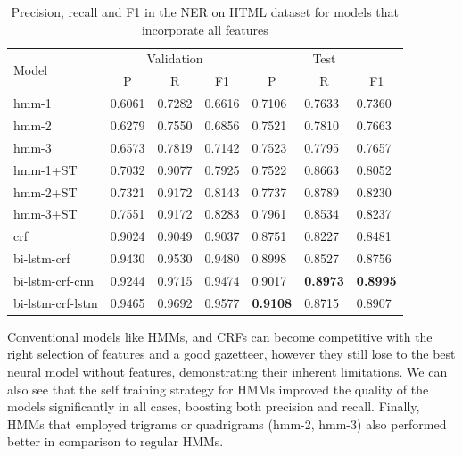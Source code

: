 \documentclass{nle}
\begin{document}
\begin{table}[h]
  \small
  \begin{center}
    \begin{tabular}{ lllllll }
      \toprule
      \multirow{2}{*}{Model} & \multicolumn{3}{c}{Validation} & \multicolumn{3}{c}{Test} \\
                             & \multicolumn{1}{c}{P} & \multicolumn{1}{c}{R} & \multicolumn{1}{c}{F1}
                             & \multicolumn{1}{c}{P} & \multicolumn{1}{c}{R} & \multicolumn{1}{c}{F1} \\
      \midrule
      hmm-1	         & 0.6061 & 0.7282 & 0.6616 & 0.7106 & 0.7633 & 0.7360 \\
      hmm-2	         & 0.6279 & 0.7550 & 0.6856 & 0.7521 & 0.7810 & 0.7663 \\
      hmm-3	         & 0.6573 & 0.7819 & 0.7142 & 0.7523 & 0.7795 & 0.7657 \\
      hmm-1+ST           & 0.7032 & 0.9077 & 0.7925 & 0.7522 & 0.8663 & 0.8052 \\
      hmm-2+ST           & 0.7321 & 0.9172 & 0.8143 & 0.7737 & 0.8789 & 0.8230 \\
      hmm-3+ST           & 0.7551 & 0.9172 & 0.8283 & 0.7961 & 0.8534 & 0.8237 \\
      crf	         & 0.9024 & 0.9049 & 0.9037 & 0.8751 & 0.8227 & 0.8481 \\
      bi-lstm-crf        & 0.9430 & 0.9530 & 0.9480 & 0.8998 & 0.8527 & 0.8756 \\
      bi-lstm-crf-cnn    & 0.9244 & 0.9715 & 0.9474 & 0.9017 & \textbf{0.8973} & \textbf{0.8995} \\
      bi-lstm-crf-lstm   & 0.9465 & 0.9692 & 0.9577 & \textbf{0.9108} & 0.8715 & 0.8907 \\
      \bottomrule
    \end{tabular}
  \end{center}
  \caption{Precision, recall and F1 in the NER on HTML dataset for models that incorporate all features}
  \label{tab:experiment2}
\end{table}

Conventional models like HMMs, and CRFs can become competitive with
the right selection of features and a good gazetteer, however they still lose
to the best neural model without features, demonstrating their inherent limitations.
We can also see that the self training strategy for HMMs improved the quality of 
the models significantly in all cases, boosting both precision and recall. Finally,
HMMs that employed trigrams or quadrigrams (hmm-2, hmm-3) also performed better in
comparison to regular HMMs.
\end{document}
